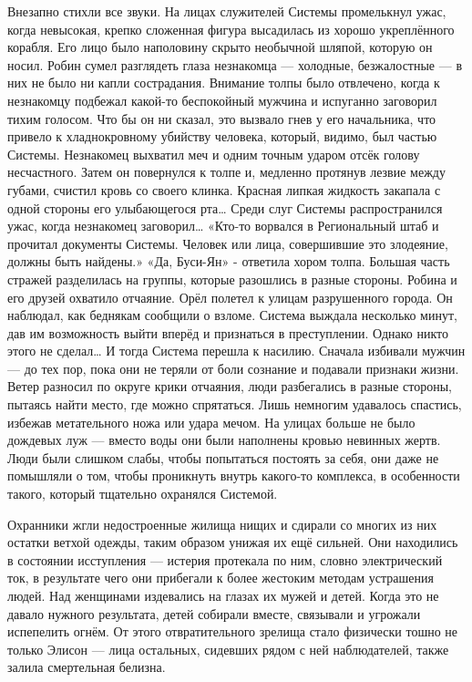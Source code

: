 \documentclass[a4paper,12pt]{book}
\begin{document}
	Внезапно стихли все звуки. На лицах служителей Системы промелькнул ужас, когда невысокая, крепко сложенная фигура высадилась из хорошо укреплённого корабля. Его лицо было наполовину скрыто необычной шляпой, которую он носил. Робин сумел разглядеть глаза незнакомца — холодные, безжалостные — в них не было ни капли сострадания. 
	Внимание толпы было отвлечено, когда к незнакомцу подбежал какой-то беспокойный мужчина и испуганно заговорил тихим голосом. Что бы он ни сказал, это вызвало гнев у его начальника, что привело к хладнокровному убийству человека, который, видимо, был частью Системы. Незнакомец выхватил меч и одним точным ударом отсёк голову несчастного. Затем он повернулся к толпе и, медленно протянув лезвие между губами, счистил кровь со своего клинка. Красная липкая жидкость закапала с одной стороны его улыбающегося рта…
	Среди слуг Системы распространился ужас, когда незнакомец заговорил…
	«Кто-то ворвался в Региональный штаб и прочитал документы Системы. Человек или лица, совершившие это злодеяние, должны быть найдены.»
	«Да, Буси-Ян» - ответила хором толпа. Большая часть стражей разделилась на группы, которые разошлись в разные стороны.
	Робина и его друзей охватило отчаяние. Орёл полетел к улицам разрушенного города. Он наблюдал, как беднякам сообщили о взломе.
	Система выждала несколько минут, дав им возможность выйти вперёд и признаться в преступлении.
	Однако никто этого не сделал…
	И тогда Система перешла к насилию. Сначала избивали мужчин — до тех пор, пока они не теряли от боли сознание и подавали признаки жизни.
	Ветер разносил по округе крики отчаяния, люди разбегались в разные стороны, пытаясь найти место, где можно спрятаться. Лишь немногим удавалось спастись, избежав метательного ножа или удара мечом. На улицах больше не было дождевых луж — вместо воды они были наполнены кровью невинных жертв. Люди были слишком слабы, чтобы попытаться постоять за себя, они даже не помышляли о том, чтобы проникнуть внутрь какого-то комплекса, в особенности такого, который тщательно охранялся Системой.

	Охранники жгли недостроенные жилища нищих и сдирали со многих из них остатки ветхой одежды, таким образом унижая их ещё сильней.
	Они находились в состоянии исступления — истерия протекала по ним, словно электрический ток, в результате чего они прибегали к более жестоким методам устрашения людей.
	Над женщинами издевались на глазах их мужей и детей. Когда это не давало нужного результата, детей собирали вместе, связывали и угрожали испепелить огнём.
	От этого отвратительного зрелища стало физически тошно не только Элисон — лица остальных, сидевших рядом с ней наблюдателей, также залила смертельная белизна.
\end{document}
